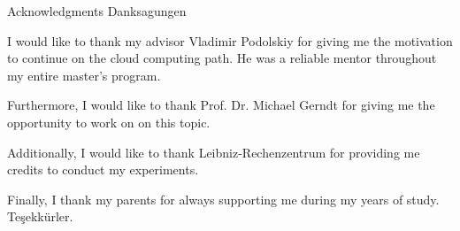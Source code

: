 \makeatletter
{}
{}
{}
\makeatother
\thispagestyle{empty}

\vspace*{20mm}

\begin{center}
\makeatletter
{}
{ Acknowledgments}
{ Danksagungen}
\makeatother
\end{center}

\vspace{10mm}

I would like to thank my advisor Vladimir Podolskiy for giving me the motivation to continue on the cloud computing path. He was a reliable mentor throughout my entire master's program.

Furthermore, I would like to thank Prof. Dr. Michael Gerndt for giving me the opportunity to work on on this topic.

Additionally, I would like to thank Leibniz-Rechenzentrum for providing me credits to conduct my experiments.

Finally, I thank my parents for always supporting me during my years of study. Teşekkürler.

\cleardoublepage{}
